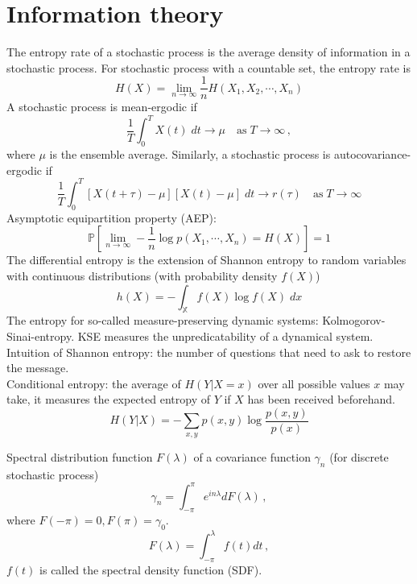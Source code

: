 \documentclass[a4paper,onecolumn]{article}
\begin{document}
\section{Information theory}
The entropy rate of a stochastic process is the average density of information in a stochastic process.
For stochastic process with a countable set, the entropy rate is
$$
    H(X) = \lim_{n\rightarrow \infty} \frac{1}{n}H(X_1, X_2, \cdots, X_n)
$$
A stochastic process is mean-ergodic if
$$
    \frac{1}{T}\int_0^T X(t) \; dt \rightarrow \mu \quad \textrm{as} \; T\rightarrow \infty\,,
$$
where $\mu$ is the ensemble average. Similarly, a stochastic process is autocovariance-ergodic if
$$
    \frac{1}{T}\int_0^T \left[X(t+\tau) - \mu\right]\left[X(t)-\mu\right] \; dt \rightarrow r(\tau) 
    \quad \textrm{as} \; T\rightarrow \infty
$$
Asymptotic equipartition property (AEP): 
$$
    \mathbb{P}\left[ \lim_{n\rightarrow \infty} -\frac{1}{n} \log p(X_1, \cdots, X_n) = H(X)\right] = 1
$$
The differential entropy is the extension of Shannon entropy to random variables with continuous distributions
(with probability density $f(X)$)
$$
    h(X) = -\int_{\mathbb{X}} f(X) \log f(X)\; dx
$$
The entropy for so-called measure-preserving dynamic systems: Kolmogorov-Sinai-entropy. KSE
measures the unpredicatability of a dynamical system.\\
Intuition of Shannon entropy: the number of questions that need to ask to restore the message.\\

Conditional entropy: the average of $H(Y|X=x)$ over all possible values $x$ may take, it measures
the expected entropy of $Y$ if $X$ has been received beforehand.
$$
    H(Y|X) = - \sum_{x,y} p(x,y) \log\frac{p(x,y)}{p(x)}
$$

Spectral distribution function $F(\lambda)$ of a covariance function $\gamma_n$
(for discrete stochastic process)
$$
    \gamma_n = \int_{-\pi}^{\pi} e^{in\lambda} dF(\lambda)\,,
$$
where $F(-\pi) = 0, F(\pi)=\gamma_0$.
$$
    F(\lambda) = \int_{-\pi}^\lambda f(t) dt\,,
$$
$f(t)$ is called the spectral density function (SDF).
\end{document}
